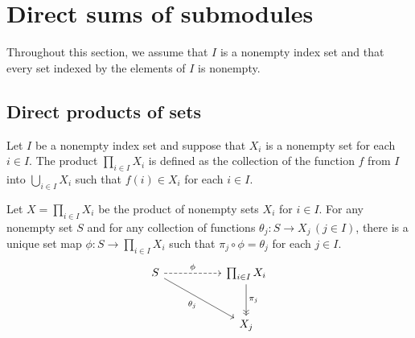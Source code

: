 \section{Direct sums of submodules}
Throughout this section, we assume that $I$ is a nonempty index set and that every set indexed by the elements of $I$ is nonempty.


\subsection{Direct products of sets}

\begin{defi}
    Let $I$ be a nonempty index set and suppose that $X_i$ is a nonempty set for each $i\in I$.
    The product $\prod_{i\in I} X_i$ is defined as the collection of the function $f$ from $I$ into $\bigcup_{i\in I} X_i$ such that $f(i)\in X_i$ for each $i\in I$.
\end{defi}

\begin{prop}
    Let $X=\prod_{i\in I} X_i$ be the product of nonempty sets $X_i$ for $i\in I$.
    For any nonempty set $S$ and for any collection of functions $\theta_j: S\rightarrow X_j\,(j\in I)$, there is a unique set map $\phi: S\rightarrow \prod_{i\in I} X_i$ such that $\pi_j\circ\phi=\theta_j$ for each $j\in I$.
    \begin{equation*}
    \begin{tikzcd}[row sep=1.0cm, column sep=1.8cm]
        S\arrow[r, "\phi", dashed]\arrow[dr, "\theta_j"']
        &
        \prod_{i\in I}X_i\arrow[d, "\pi_j", ->>]\\
        & X_j
    \end{tikzcd}
    \end{equation*}
\end{prop}

